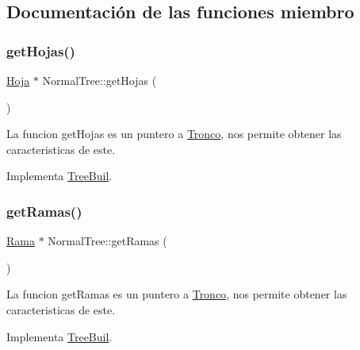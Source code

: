 \subsection{Documentación de las funciones miembro}
\mbox{\label{classNormalTree_af856515defde72c7d3350902bfe1cc3e}} 
\subsubsection{\texorpdfstring{get\+Hojas()}{getHojas()}}
{\footnotesize\ttfamily \hyperlink{classHoja}{Hoja} $\ast$ Normal\+Tree\+::get\+Hojas (\begin{DoxyParamCaption}{ }\end{DoxyParamCaption})\hspace{0.3cm}{\ttfamily [virtual]}}

La funcion get\+Hojas es un puntero a \hyperlink{classTronco}{Tronco}, nos permite obtener las caracteristicas de este. 

Implementa \hyperlink{classTreeBuil_a76ddaf2d79386ffabe5bf17e0c6d887e}{Tree\+Buil}.

\mbox{\label{classNormalTree_ad96708fd66844690669bd9d733b41063}} 
\subsubsection{\texorpdfstring{get\+Ramas()}{getRamas()}}
{\footnotesize\ttfamily \hyperlink{classRama}{Rama} $\ast$ Normal\+Tree\+::get\+Ramas (\begin{DoxyParamCaption}{ }\end{DoxyParamCaption})\hspace{0.3cm}{\ttfamily [virtual]}}

La funcion get\+Ramas es un puntero a \hyperlink{classTronco}{Tronco}, nos permite obtener las caracteristicas de este. 

Implementa \hyperlink{classTreeBuil_ad8c90d4466a151a8082eeae13400e6cc}{Tree\+Buil}.

\mbox{\label{classNormalTree_a95dcc1035a23a0142ace79e5f994e85a}} 
